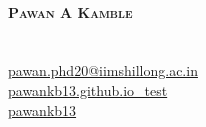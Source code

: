 \begin{minipage}[c]{0.05\textwidth}
\-\
\end{minipage}

\begin{minipage}[]{0.4\textwidth}
    \textbf{\huge \scshape{Pawan A Kamble \\}} \\
    \faPhone \hspace{3pt}{+91 7709021424} \\
    \faEnvelope \hspace{3pt} \href{mailto:pawan.phd20@iimshillong.ac.in}{pawan.phd20@iimshillong.ac.in} \\
    \faGlobe \hspace{3pt} \href{https://pawankb13.github.io/}{pawankb13.github.io_test} \\
    \faLinkedin \hspace{3pt} \href{https://www.linkedin.com/in/pawankb13}{pawankb13}
\end{minipage}

\hfill
\begin{minipage}[c]{0.2\textwidth}
\end{minipage}

